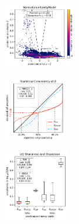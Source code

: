 \begin{figure}[H]
    \begin{subfigure}
    \centering
    \includegraphics[width=0.345\textwidth,valign=t]{uncertainty/figures/uq.normaluncertaintymodel-correlation.pdf}
    \end{subfigure}
    \begin{subfigure}
    \centering
    \includegraphics[width=0.297\textwidth,valign=t]{uncertainty/figures/uq.normaluncertaintymodel-consistency.pdf}
    \end{subfigure}
    \begin{subfigure}
    \centering
    \includegraphics[width=0.308\textwidth,valign=t]{uncertainty/figures/uq.normaluncertaintymodel-sharpness.pdf}
    \end{subfigure}


\end{figure}
